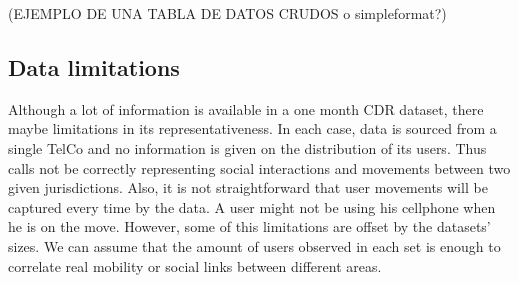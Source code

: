 (EJEMPLO DE UNA TABLA DE DATOS CRUDOS o simpleformat?)

\subsection{Data limitations}

Although a lot of information is available in a one month CDR dataset, there maybe limitations in its representativeness. In each case, data is sourced from a single TelCo and no information is given on the distribution of its users. Thus calls not be correctly representing social interactions and movements between two given jurisdictions. Also, it is not straightforward that user movements will be captured every time by the data. A user might not be using his cellphone when he is on the move.
However, some of this limitations are offset by the datasets' sizes. We can assume that the amount of users observed in each set is enough to correlate real mobility or social links between different areas.

